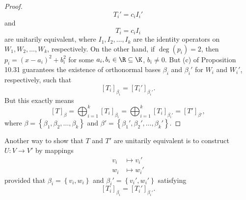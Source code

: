 \documentclass[linearalgebra]{subfiles}
\begin{document}
\begin{proof}
        \begin{equation*}
            T_i' = c_iI_i'
        \end{equation*}
        and
        \begin{equation*}
            T_i = c_iI_i
        \end{equation*}
        are unitarily equivalent, where $I_1,I_2,\ldots,I_k$ are the identity operators on $W_1,W_2,\ldots,W_k$, respectively. On the other hand, if $\deg\left( p_i \right) = 2$, then $p_i = \left( x-a_i \right) ^{2} +b_i^{2}$ for some $a_i,b_i\in\R\subseteq\K$, $b_i\neq 0$. But (c) of Proposition 10.31 guarantees the existence of orthonormal bases $\beta_i$ and $\beta_i'$ for $W_i$ and $W_i'$, respectively, such that
        \begin{equation*}
            \left[ T_i \right] _{\beta_i} = \left[ T_i' \right] _{\beta_i'}.
        \end{equation*}
        But this exactly means
        \begin{equation*}
            \left[ T \right] _\beta = \bigoplus^{k}_{i=1} \left[ T_i \right] _{\beta_i} = \bigoplus^{k}_{i=1} \left[ T_i \right] _{\beta_i'} = \left[ T' \right] _{\beta'},
        \end{equation*}
        where $\beta = \left\lbrace \beta_1,\beta_2,\ldots,\beta_k \right\rbrace$ and $\beta' = \left\lbrace \beta_1', \beta_2', \ldots, \beta_k' \right\rbrace$. 
    \end{proof}

    \begin{remark}
        Another way to show that $T$ and $T'$ are unitarily equivalent is to construct $U:V\to V'$ by mappings
        \begin{align*}
            v_i&\mapsto v_i' \\
            w_i&\mapsto w_i'
        \end{align*} 
        provided that $\beta_i = \left\lbrace v_i,w_i \right\rbrace$ and $\beta_i'=\left\lbrace v_i',w_i' \right\rbrace$ satisfying
        \begin{equation*}
            \left[ T_i \right] _{\beta_i} = \left[ T_i' \right] _{\beta_i'}.
        \end{equation*}
    \end{remark}
\end{document}
